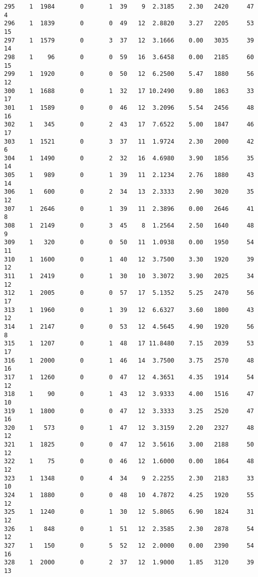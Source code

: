 \documentclass[
  letterpaper,
  DIV=11,
  numbers=noendperiod]{scrreprt}
\begin{document}
\begin{verbatim}
295    1  1984       0       1  39    9  2.3185    2.30   2420     47       4
296    1  1839       0       0  49   12  2.8820    3.27   2205     53      15
297    1  1579       0       3  37   12  3.1666    0.00   3035     39      14
298    1    96       0       0  59   16  3.6458    0.00   2185     60      15
299    1  1920       0       0  50   12  6.2500    5.47   1880     56      12
300    1  1688       0       1  32   17 10.2490    9.80   1863     33      17
301    1  1589       0       0  46   12  3.2096    5.54   2456     48      16
302    1   345       0       2  43   17  7.6522    5.00   1847     46      17
303    1  1521       0       3  37   11  1.9724    2.30   2000     42       6
304    1  1490       0       2  32   16  4.6980    3.90   1856     35      14
305    1   989       0       1  39   11  2.1234    2.76   1880     43      14
306    1   600       0       2  34   13  2.3333    2.90   3020     35      12
307    1  2646       0       1  39   11  2.3896    0.00   2646     41       8
308    1  2149       0       3  45    8  1.2564    2.50   1640     48       9
309    1   320       0       0  50   11  1.0938    0.00   1950     54      11
310    1  1600       0       1  40   12  3.7500    3.30   1920     39      12
311    1  2419       0       1  30   10  3.3072    3.90   2025     34      12
312    1  2005       0       0  57   17  5.1352    5.25   2470     56      17
313    1  1960       0       1  39   12  6.6327    3.60   1800     43      12
314    1  2147       0       0  53   12  4.5645    4.90   1920     56       8
315    1  1207       0       1  48   17 11.8480    7.15   2039     53      17
316    1  2000       0       1  46   14  3.7500    3.75   2570     48      16
317    1  1260       0       0  47   12  4.3651    4.35   1914     54      12
318    1    90       0       1  43   12  3.9333    4.00   1516     47      10
319    1  1800       0       0  47   12  3.3333    3.25   2520     47      16
320    1   573       0       1  47   12  3.3159    2.20   2327     48      12
321    1  1825       0       0  47   12  3.5616    3.00   2188     50      12
322    1    75       0       0  46   12  1.6000    0.00   1864     48      12
323    1  1348       0       4  34    9  2.2255    2.30   2183     33      10
324    1  1880       0       0  48   10  4.7872    4.25   1920     55      12
325    1  1240       0       1  30   12  5.8065    6.90   1824     31      12
326    1   848       0       1  51   12  2.3585    2.30   2878     54      12
327    1   150       0       5  52   12  2.0000    0.00   2390     54      16
328    1  2000       0       2  37   12  1.9000    1.85   3120     39      13

\end{verbatim}
\end{document}
